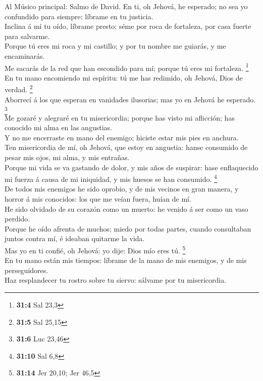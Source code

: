  Al Músico principal: Salmo de David. En ti, oh Jehová, he
esperado; no sea yo confundido para siempre: líbrame en tu justicia.\\
 Inclina á mí tu oído, líbrame presto; séme por roca de
fortaleza, por casa fuerte para salvarme.\\
 Porque tú eres mi roca y mi castillo; y por tu nombre me
guiarás, y me encaminarás.\\
 Me sacarás de la red que han escondido para mí; porque tú
eres mi fortaleza. \footnote{\textbf{31:4} Sal 23,3}\\
 En tu mano encomiendo mi espíritu: tú me has redimido, oh
Jehová, Dios de verdad. \footnote{\textbf{31:5} Sal 25,15}\\
 Aborrecí á los que esperan en vanidades ilusorias; mas yo
en Jehová he esperado. \footnote{\textbf{31:6} Luc 23,46}\\
 Me gozaré y alegraré en tu misericordia; porque has visto
mi aflicción; has conocido mi alma en las angustias.\\
 Y no me encerraste en mano del enemigo; hiciste estar mis
pies en anchura.\\
 Ten misericordia de mí, oh Jehová, que estoy en angustia:
hanse consumido de pesar mis ojos, mi alma, y mis entrañas.\\
 Porque mi vida se va gastando de dolor, y mis años de
suspirar: hase enflaquecido mi fuerza á causa de mi iniquidad, y mis
huesos se han consumido. \footnote{\textbf{31:10} Sal 6,8}\\
 De todos mis enemigos he sido oprobio, y de mis vecinos en
gran manera, y horror á mis conocidos: los que me veían fuera, huían de
mí.\\
 He sido olvidado de su corazón como un muerto: he venido á
ser como un vaso perdido.\\
 Porque he oído afrenta de muchos; miedo por todas partes,
cuando consultaban juntos contra mí, é ideaban quitarme la vida.\\
 Mas yo en ti confié, oh Jehová: yo dije: Dios mío eres tú.
\footnote{\textbf{31:14} Jer 20,10; Jer 46,5}\\
 En tu mano están mis tiempos: líbrame de la mano de mis
enemigos, y de mis perseguidores.\\
 Haz resplandecer tu rostro sobre tu siervo: sálvame por tu
misericordia.\\
